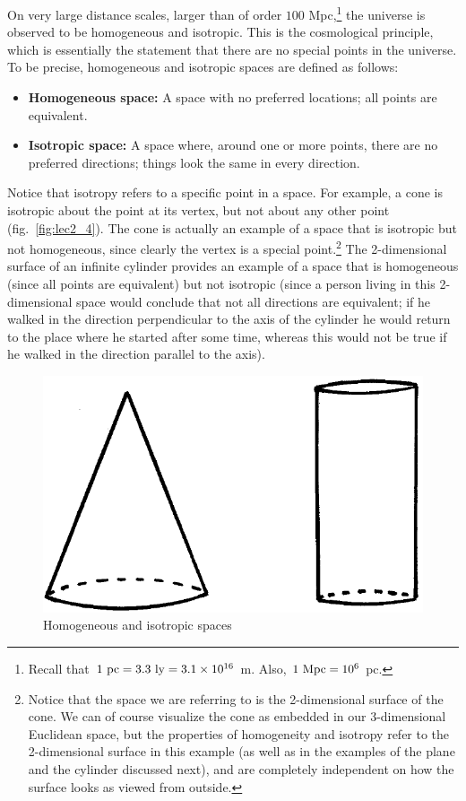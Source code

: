 \documentclass[11pt, a4paper,oneside,openright]{book}
\numberwithin{equation}{section}
\begin{document}
On very large distance scales, larger than of order $100$ Mpc,\footnote{Recall that $1~{\rm pc}=3.3~{\rm ly}=3.1\times10^{16}$ m. Also, $1~{\rm Mpc}=10^6$ pc.} the universe is observed to be homogeneous and isotropic. This is the cosmological principle, which is essentially the statement that there are no special points in the universe. To be precise, homogeneous and isotropic spaces are defined as follows:
\begin{itemize}
\item {\bf Homogeneous space:} A space with no preferred locations; all points are equivalent.
\item {\bf Isotropic space:} A space where, around one or more points, there are no preferred directions; things look the same in every direction.
\end{itemize}
Notice that isotropy refers to a specific point in a space. For example, a cone is isotropic about the point at its vertex, but not about any other point (fig.\ \ref{fig:lec2_4}). The cone is actually an example of a space that is isotropic but not homogeneous, since clearly the vertex is a special point.\footnote{Notice that the space we are referring to is the 2-dimensional surface of the cone. We can of course visualize the cone as embedded in our 3-dimensional Euclidean space, but the properties of homogeneity and isotropy refer to the 2-dimensional surface in this example (as well as in the examples of the plane and the cylinder discussed next), and are completely independent on how the surface looks as viewed from outside.} The 2-dimensional surface of an infinite cylinder provides an example of a space that is homogeneous (since all points are equivalent) but not isotropic (since a person living in this 2-dimensional space would conclude that not all directions are equivalent; if he walked in the 
direction perpendicular to the axis of the cylinder he would return to the place where he started after some time, whereas this would not be true if he walked in the direction parallel to the axis).
\begin{figure}[ht]
\begin{center}
\includegraphics[scale=0.4]{Draw/lec4_4.png}
\end{center}
\caption{Homogeneous and isotropic spaces}
\label{fig:lec4_4}
\end{figure}
\end{document}
